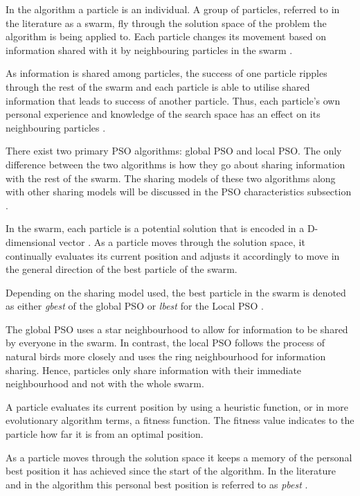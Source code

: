 In the algorithm a particle is an individual. A group of particles, referred to in the literature as a swarm, fly through the solution space of the problem the algorithm is being applied to. Each particle changes its movement based on information shared with it by neighbouring particles in the swarm \cite{FundamentalSwarm,CompuIntelligenceIntro}. 

As information is shared among particles, the success of one particle ripples through the rest of the swarm and each particle is able to utilise shared information that leads to success of another particle. Thus, each particle's own personal experience and knowledge of the search space has an effect on its neighbouring particles \cite{FundamentalSwarm,CompuIntelligenceIntro}.

There exist two primary PSO algorithms: global PSO and local PSO. The only difference between the two algorithms is how they go about sharing information with the rest of the swarm. The sharing models of these two algorithms along with other sharing models will be discussed in the PSO characteristics subsection \cite{SOSwarm}.

In the swarm, each particle is a potential solution that is encoded in a D-dimensional vector \cite{PSOHybridJobShop,PSOSelfHierarch}. As a particle moves through the solution space, it continually evaluates its current position and adjusts it accordingly to move in the general direction of the best particle of the swarm. 

Depending on the sharing model used, the best particle in the swarm is denoted as either \emph{gbest} of the global PSO or \emph{lbest} for the Local PSO \cite{SOSwarm,FundamentalSwarm,CompuIntelligenceIntro}. 

The global PSO uses a star neighbourhood to allow for information to be shared by everyone in the swarm. In contrast, the local PSO follows the process of natural birds more closely and uses the ring neighbourhood for information sharing. Hence, particles only share information with their immediate neighbourhood and not with the whole swarm.

A particle evaluates its current position by using a heuristic function, or in more evolutionary algorithm terms, a fitness function. The fitness value indicates to the particle how far it is from an optimal position\cite{CompuIntelligenceIntro}. 

As a particle moves through the solution space it keeps a memory of the personal best position it has achieved since the start of the algorithm. In the literature and in the algorithm this personal best position is referred to as \emph{pbest} \cite{SOSwarm}.

